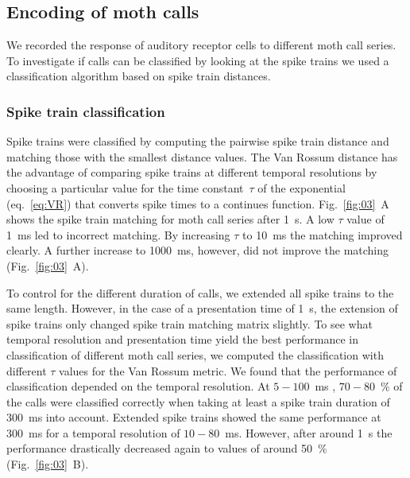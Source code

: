 \documentclass[12pt,a4paper,pdftex]{article}
\newcommand{\fig}[2]{(Fig.~#1~#2)}
\newcommand{\percent}[1]{#1~$\%$}
\begin{document}
\subsection*{Encoding of moth calls}
\label{mothcalls}
We recorded the response of auditory receptor cells to different moth call series. To investigate if calls can be classified by looking at the spike trains we used a classification algorithm based on spike train distances.
\subsubsection*{Spike train classification}
Spike trains were classified by computing the pairwise spike train distance and matching those with the smallest distance values. The Van Rossum distance has the advantage of comparing spike trains at different temporal resolutions by choosing a particular value for the time constant~$\tau$ of the exponential (eq.~\ref{eq:VR}) that converts spike times to a continues function. Fig.~\ref{fig:03}~A shows the spike train matching for moth call series after 1~s. A low $\tau$ value of 1~ms led to incorrect matching. By increasing $\tau$ to 10~ms the matching improved clearly. A further increase to 1000~ms, however, did not improve the matching \fig{\ref{fig:03}}{A}. 

To control for the different duration of calls, we extended all spike trains to the same length.
However, in the case of a presentation time of 1~s, the extension of spike trains only changed spike train matching matrix slightly.
To see what temporal resolution and presentation time yield the best performance in classification of different moth call series, we computed the classification with different $ \tau $ values for the Van Rossum metric. We found that the performance of classification depended on the temporal resolution. At $5-100$~ms , \percent{$70-80$} of the calls were classified correctly when taking at least a spike train duration of 300~ms into account. Extended spike trains showed the same performance at 300~ms for a temporal resolution of $10-80$~ms. However, after around 1~s the performance drastically decreased again to values of around \percent{50} \fig{\ref{fig:03}}{B}. 
\end{document}
